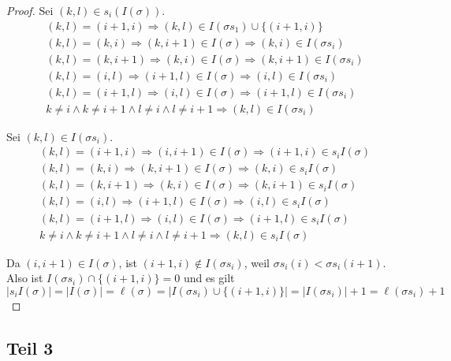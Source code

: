 \documentclass[10pt,a4paper]{article}
\begin{document}
\begin{proof}
Sei $(k, l) \in s_{i}(I(\sigma))$.
\begin{align*}
(k, l) = (i + 1, i) \Rightarrow (k, l) \in I(\sigma s_{1}) \cup \{(i + 1, i)\}\\
(k, l) = (k, i) \Rightarrow (k, i + 1) \in I(\sigma) \Rightarrow (k, i) \in I(\sigma s_{i})\\
(k, l) = (k, i + 1) \Rightarrow (k, i) \in I(\sigma) \Rightarrow (k, i + 1) \in I(\sigma s_{i})\\
(k, l) = (i, l) \Rightarrow (i + 1, l) \in I(\sigma) \Rightarrow (i, l) \in I(\sigma s_{i})\\
(k, l) = (i + 1, l) \Rightarrow (i, l) \in I(\sigma) \Rightarrow (i + 1, l) \in I(\sigma s_{i})\\
k \ne i \land k \ne i + 1 \land l \ne i \land l \ne i + 1 \Rightarrow (k, l) \in I(\sigma s_{i})
\end{align*}

Sei $(k, l) \in I(\sigma s_{i})$.
\begin{align*}
(k, l) = (i + 1, i) \Rightarrow (i, i + 1) \in I(\sigma) \Rightarrow (i + 1, i) \in s_{i}I(\sigma)\\
(k, l) = (k, i) \Rightarrow (k, i + 1) \in I(\sigma) \Rightarrow (k, i) \in s_{i}I(\sigma)\\
(k, l) = (k, i + 1) \Rightarrow (k, i) \in I(\sigma) \Rightarrow (k, i + 1) \in s_{i}I(\sigma)\\
(k, l) = (i, l) \Rightarrow (i + 1, l) \in I(\sigma) \Rightarrow (i, l) \in s_{i}I(\sigma)\\
(k, l) = (i + 1, l) \Rightarrow (i, l) \in I(\sigma) \Rightarrow (i + 1, l) \in s_{i}I(\sigma)\\
k \ne i \land k \ne i + 1 \land l \ne i \land l \ne i + 1 \Rightarrow (k, l) \in s_{i}I(\sigma)
\end{align*}

Da $(i, i + 1) \in I(\sigma)$, ist $(i + 1, i) \notin I(\sigma s_{i})$, weil $\sigma s_{i}(i) < \sigma s_{i}(i + 1)$.
Also ist $I(\sigma s_{i}) \cap \{(i + 1, i)\} = 0$ und es gilt
\begin{equation}
|s_{i}I(\sigma)| = |I(\sigma)| = \ell(\sigma) = |I(\sigma s_{i}) \cup \{(i + 1, i)\}| = |I(\sigma s_{i})| + 1 = \ell(\sigma s_{i}) + 1
\end{equation}
\end{proof}

\subsection*{Teil 3}
\end{document}

